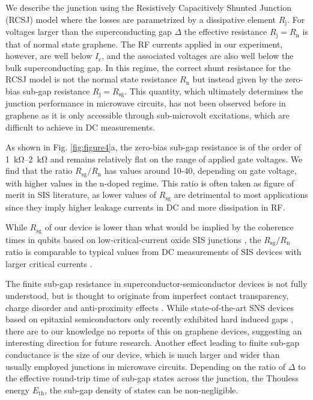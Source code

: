 We describe the junction using the Resistively Capacitively Shunted Junction (RCSJ) model where the losses are parametrized by a dissipative element $R_\text{j}$.
For voltages larger than the superconducting gap $\Delta$ the effective resistance $R_\text{j} = R_\text{n}$ is that of normal state graphene.
The RF currents applied in our experiment, however, are well below $I_\text{c}$, and the associated voltages are also well below the bulk superconducting gap.
In this regime, the correct shunt resistance for the RCSJ model is not the normal state resistance $R_\text{n}$ but instead given by the zero-bias sub-gap resistance $R_\text{j} = R_\text{sg}$.
This quantity, which ultimately determines the junction performance in microwave circuits, has not been observed before in graphene as it is only accessible through sub-microvolt excitations, which are difficult to achieve in DC measurements.

As shown in Fig. \ref{fig:figure4}a, the zero-bias sub-gap resistance is of the order of \SIrange{1}{2}{\kilo\ohm} and remains relatively flat on the range of applied gate voltages.
We find that the ratio $R_\text{sg}/R_\text{n}$ has values around 10-40, depending on gate voltage, with higher values in the n-doped regime.
This ratio is often taken as figure of merit in SIS literature, as lower values of $R_\text{sg}$ are detrimental to most applications since they imply higher leakage currents in DC and more dissipation in RF.

While $R_\text{sg}$ of our device is lower than what would be implied by the coherence times in qubits based on low-critical-current oxide SIS junctions \cite{paikObservationHighCoherence2011g}, the $R_\text{sg}/R_\text{n}$ ratio is comparable to typical values from DC measurements of SIS devices with larger critical currents \cite{iosadCharacterizationFabricationProcess2002b,tolpygoSubgapLeakageHboxNb2013}.

The finite sub-gap resistance in superconductor-semiconductor devices is not fully understood, but is thought to originate from imperfect contact transparency, charge disorder and anti-proximity effects \cite{liuPhenomenologySoftGap2017a,bretheauTunnellingSpectroscopyAndreev2017a}.
While state-of-the-art SNS devices based on epitaxial semiconductors only recently exhibited hard induced gaps \cite{changHardGapEpitaxial2015,kjaergaardQuantizedConductanceDoubling2016}, there are to our knowledge no reports of this on graphene devices, suggesting an interesting direction for future research.
Another effect leading to finite sub-gap conductance is the size of our device, which is much larger and wider than usually employed junctions in microwave circuits.
Depending on the ratio of $\Delta$ to the effective round-trip time of sub-gap states across the junction, the Thouless energy $E_\text{th}$, the sub-gap density of states can be non-negligible.

